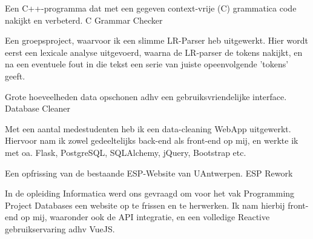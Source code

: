 
\begin{cventries}
    
    \cventry
        {Een C++-programma dat met een gegeven context-vrije (C) grammatica code nakijkt en verbeterd.} %
        {C Grammar Checker} %
        {} %
        {} %
        {
            \begin{cvitems} %
    		    \item
    		    {
    	            Een groepsproject, waarvoor ik een slimme LR-Parser heb uitgewerkt. Hier wordt eerst een lexicale analyse uitgevoerd, waarna de LR-parser de tokens nakijkt, en na een eventuele fout in die tekst een serie van juiste opeenvolgende 'tokens' geeft.
    	        }
            \end{cvitems}
        }

    \cventry
        {Grote hoeveelheden data opschonen adhv een gebruiksvriendelijke interface.} %
        {Database Cleaner} %
        {} %
        {} %
        {
        \begin{cvitems} %
      	    \item
      	    {
      	        Met een aantal medestudenten heb ik een data-cleaning WebApp uitgewerkt. Hiervoor nam ik zowel gedeeltelijks back-end als front-end op mij, en werkte ik met oa. Flask, PostgreSQL, SQLAlchemy, jQuery, Bootstrap etc.
            }
        \end{cvitems}
    }
    
    \cventry
    {Een opfrissing van de bestaande ESP-Website van UAntwerpen.} %
    {ESP Rework} %
    {} %
    {} %
    {
        \begin{cvitems} %
      	    \item 
      	    {
      	        In de opleiding Informatica werd ons gevraagd om voor het vak Programming Project Databases een website op te frissen en te herwerken. Ik nam hierbij front-end op mij, waaronder ook de API integratie, en een volledige Reactive gebruikservaring adhv VueJS.
  	        }
        \end{cvitems}
    }
    
\end{cventries}